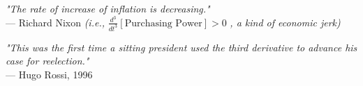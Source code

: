 \begin{flushright}
\emph{"The rate of increase of inflation is decreasing."}\\
--- Richard Nixon \quad \textit{(i.e., } $\frac{d^3}{dt^3}[\text{Purchasing Power}] > 0$ \textit{, a kind of economic jerk)}
\end{flushright}

\begin{flushright}
\emph{"This was the first time a sitting president used the third derivative to advance his case for reelection."}\\
--- Hugo Rossi, 1996
\end{flushright}

